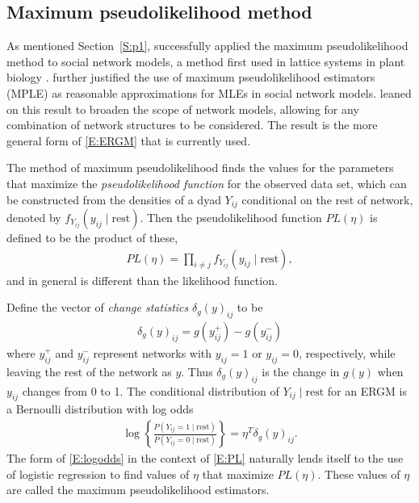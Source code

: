 \subsection{Maximum pseudolikelihood method} \label{S:pseudolikelihood}
As mentioned Section~\ref{S:p1}, \citet{Frank:1986} successfully applied 
the maximum pseudolikelihood method to social network models, a method first used in lattice systems in plant biology \citep{Besag:1974,Besag:1975}.  \citet{Strauss:1990} further justified the use of 
maximum pseudolikelihood estimators (MPLE) as reasonable approximations for MLEs in 
social network models.  \citet*{Wasserman:1996, Pattison:1999, logit} leaned on this 
result to broaden the scope of network models, allowing 
for any combination of network structures to be considered.  The result is the more general form of \eqref{E:ERGM} that is currently used.

The method of maximum pseudolikelihood finds the values for the parameters that 
maximize the \textit{pseudolikelihood function} for the observed 
data set, which can be constructed from the densities of a dyad $Y_{ij}$ 
conditional on the rest of network, denoted by $f_{Y_{ij}}( y_{ij} \mid \textrm{rest})$.
Then the pseudolikelihood function $PL(\eta)$ is defined to be the product of these,
\begin{align}
	PL(\eta) = \prod_{i \neq j}f_{Y_{ij}}( y_{ij} \mid \textrm{rest}), \label{E:PL}
\end{align}
and in general is different than the likelihood function.

Define the vector of \textit{change statistics} $\delta_g(y)_{ij}$ to be
\begin{align*}
	\delta_g(y)_{ij} = g(y_{ij}^+) - g(y_{ij}^-)
\end{align*}
where $y_{ij}^+$ and $y_{ij}^-$ represent networks with $y_{ij} = 1$ or $y_{ij} = 0$, 
respectively, while leaving the rest of the network as $y$.  Thus $\delta_g(y)_{ij}$ 
is the change in $g(y)$ when $y_{ij}$ changes from 0 to 1.
The conditional distribution of $Y_{ij} \mid \textrm{rest}$ for an ERGM is a Bernoulli 
distribution with log odds
\begin{align}
	\log \left \{ \frac{P( Y_{ij} =1 \mid \textrm{rest} ) }
				 	 { P( Y_{ij} =0 \mid \textrm{rest} ) } \right \} 
					 			= \eta^T \delta_g(y)_{ij}. \label{E:logodds}
\end{align}
The form of \eqref{E:logodds} in the context of \eqref{E:PL} naturally lends
itself to the use of logistic regression to find values of $\eta$ that
maximize $PL(\eta)$.  These values of $\eta$ are called the maximum pseudolikelihood estimators.

